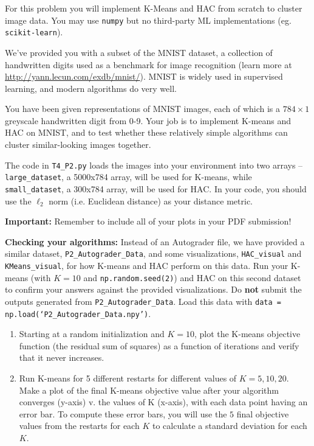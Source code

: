 \documentclass[submit]{harvardml}
\begin{document}
\begin{problem}


For this problem you will implement K-Means and HAC from scratch to cluster image data. You may use \texttt{numpy} but no third-party ML implementations (eg. \texttt{scikit-learn}).

We've provided you with a subset of the MNIST dataset, a collection of
handwritten digits used as a benchmark for image recognition (learn more at
\url{http://yann.lecun.com/exdb/mnist/}). MNIST is widely used in supervised learning, and modern algorithms do very well. 

You have been given
representations of MNIST images, each of which is a $784\times1$
greyscale handwritten digit from 0-9. Your job is to implement K-means and HAC on MNIST, and to test whether these relatively
simple algorithms can cluster similar-looking images together.

The code in \texttt{T4\_P2.py} loads the images into your environment into two arrays -- \texttt{large\_dataset}, a 5000x784 array, will be used for K-means, while \texttt{small\_dataset}, a 300x784 array, will be used for HAC. In your code, you should use the $\ell_2$ norm (i.e. Euclidean distance) as your distance metric.

\textbf{Important:} Remember to include all of your plots in your PDF submission!

\textbf{Checking your algorithms:} Instead of an Autograder file, we have provided a similar dataset, \texttt{P2\_Autograder\_Data}, and some visualizations, \texttt{HAC\_visual} and \texttt{KMeans\_visual}, for how K-means and HAC perform on this data. Run your K-means (with $K=10$ and \texttt{np.random.seed(2)}) and HAC on this second dataset to confirm your answers against the provided visualizations. Do \textbf{not} submit the outputs generated from \texttt{P2\_Autograder\_Data}. Load this data with \texttt{data = np.load(`P2\_Autograder\_Data.npy')}.

\begin{enumerate}

\item Starting at a random initialization and $K = 10$, plot
  the K-means objective function (the residual sum of squares) as a function of iterations and verify
  that it never increases.

\item Run K-means for 5 different restarts for different values of $K = 5, 10, 20$. Make a plot of the final K-means objective value after your algorithm converges (y-axis) v. the values of K (x-axis), with each data point having an error bar. To compute these error bars, you will use the $5$ final objective values from the restarts for each $K$ to calculate a standard deviation for each $K$.


\end{enumerate}
\end{problem}
\end{document}
